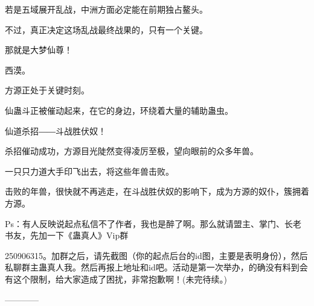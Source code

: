 \begin{this_body}
若是五域展开乱战，中洲方面必定能在前期独占鳌头。

不过，真正决定这场乱战最终战果的，只有一个关键。

那就是大梦仙尊！

西漠。

方源正处于关键时刻。

仙蛊斗正被催动起来，在它的身边，环绕着大量的辅助蛊虫。

仙道杀招――斗战胜伏奴！

杀招催动成功，方源目光陡然变得凌厉至极，望向眼前的众多年兽。

一只只力道大手印飞出去，将这些年兽击败。

击败的年兽，很快就不再逃走，在斗战胜伏奴的影响下，成为方源的奴仆，簇拥着方源。

Ps：有人反映说起点私信不了作者，我也是醉了啊。那么就请盟主、掌门、长老书友，先加一下《蛊真人》Vip群

250906315。加群之后，请先截图（你的起点后台的id图，主要是表明身份），然后私聊群主蛊真人我。然后再报上地址和id吧。活动是第一次举办，的确没有料到会有这个限制，给大家造成了困扰，非常抱歉啊！(未完待续。)

------------

\end{this_body}

